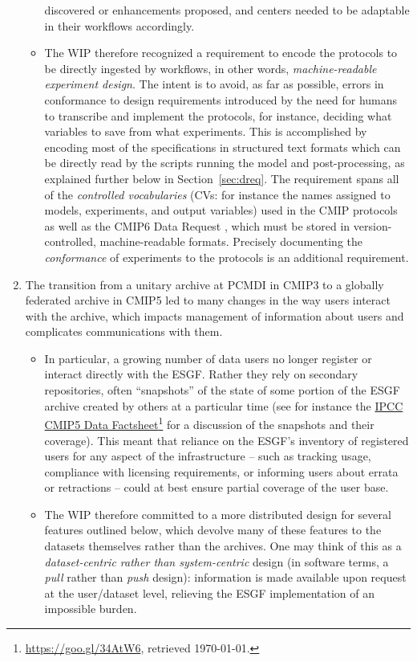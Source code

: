 \documentclass[gmd,manuscript]{copernicus}
\newcommand{\pllabel}[1]{\label{p-#1}\linelabel{l-#1}}
\newcommand{\urlref}[2] {\href{#1}{#2}\footnote{\url{#1}, retrieved \today.}}
\begin{document}
\begin{enumerate}
\begin{itemize}
   discovered or enhancements proposed, and centers needed to be 
   adaptable in their workflows accordingly.
 \item The WIP therefore recognized a requirement to encode the
   protocols to be directly ingested by workflows, in other words,
   \emph{machine-readable experiment design}.
   \pllabel{RC1-14}
   The intent is to avoid, as far as possible, errors in conformance
   to design requirements introduced by the need for humans to
   transcribe and implement the protocols, for instance, deciding what
   variables to save from what experiments. This is accomplished by
   encoding most of the specifications in structured text formats
   which can be directly read by the scripts running the model and
   post-processing, as explained further below in
   Section~\ref{sec:dreq}. The requirement spans all of the
   \emph{controlled vocabularies} (CVs: for instance the names
   assigned to models, experiments, and output variables) used in the
   CMIP protocols as well as the CMIP6 Data Request
   \citep{ref:juckesetal2015}, which must be stored in
   version-controlled, machine-readable formats. Precisely documenting
   the \emph{conformance} of experiments to the protocols
   \citep{ref:lawrenceetal2012} is an additional requirement.
  \end{itemize}
\item\label{snap} The transition from a unitary archive at PCMDI in
  CMIP3 to a globally federated archive in CMIP5 led to many changes
  in the way users interact with the archive, which impacts management
  of information about users and complicates communications with them.
  \begin{itemize}
  \item In particular, a growing number of data users no longer
    register or interact directly with the ESGF. Rather they rely on
    secondary repositories, often ``snapshots'' of the state of some
    portion of the ESGF archive created by others at a particular time
    (see for instance the \urlref{https://goo.gl/34AtW6}{IPCC CMIP5 Data
      Factsheet}
    \pllabel{RC1-15}
    for a discussion of the snapshots and their coverage). This meant
    that reliance on the ESGF's inventory of registered users for any
    aspect of the infrastructure -- such as tracking usage, compliance
    with licensing requirements, or informing users about errata or
    retractions -- could at best ensure partial coverage of the user
    base.
  \item The WIP therefore committed to a more distributed design for
    several features outlined below, which devolve many of these
    features to the datasets themselves rather than the archives. One
    may think of this as a \emph{dataset-centric rather than
      system-centric} design (in software terms, a \emph{pull} rather
    than \emph{push} design): information is made available upon
    request at the user/dataset level, relieving the ESGF
    implementation of an impossible burden.
  \end{itemize}
\end{enumerate}
\end{document}
